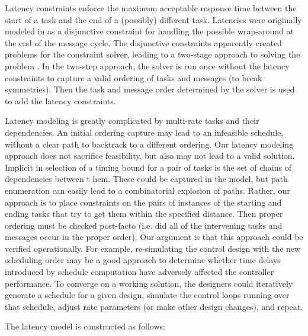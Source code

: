 Latency constraints enforce the maximum acceptable response time between the start of a task and the end 
of a (possibly) different task.  Latencies were originally modeled in \cite{sched:offline} as a 
disjunctive constraint for handling the possible wrap-around at the end of the message cycle.  The 
disjunctive constraints apparently created problems for the constraint solver, leading to a two-stage 
approach to solving the problem \cite{sched:offline}.  In the two-step approach, the solver is run once 
without the latency constraints to capture a valid ordering of tasks and messages (to break symmetries).  
Then the task and message order determined by the solver is used to add the latency constraints.  

Latency modeling is greatly complicated by multi-rate tasks and their dependencies.  An initial ordering 
capture may lead to an infeasible schedule, without a clear path to backtrack to a different ordering.   
Our latency modeling approach does not sacrifice feasibility, but also may not lead to a valid solution.  
Implicit in selection of a timing bound for a pair of tasks is the set of chains of dependencies between t
hem.  These could be captured in the model, but path enumeration can easily lead to a combinatorial 
explosion of paths.  Rather, our approach is to place constraints on the pairs of instances of the 
starting and ending tasks that try to get them within the specified distance.  Then proper ordering must 
be checked post-facto (i.e. did all of the intervening tasks and messages occur in the proper order).  
Our argument is that this approach could be verified operationally.  For example, re-simulating the 
control design with the new scheduling order may be a good approach to determine whether time delays 
introduced by schedule computation have adversely affected the controller performance.  To converge on a 
working solution, the designers could iteratively generate a schedule for a given design, simulate the 
control loops running over that schedule, adjust rate parameters (or make other design changes), and 
repeat.

The latency model is constructed as follows:

